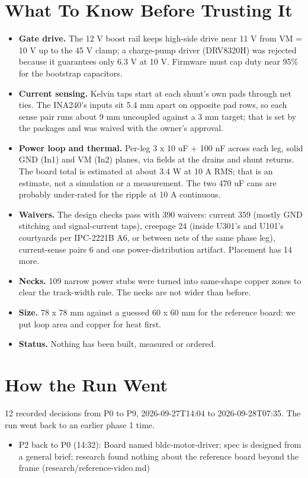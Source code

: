 \documentclass[11pt,a4paper]{article}
\begin{document}
\section{What To Know Before Trusting It}
\begin{itemize}
\item \textbf{Gate drive.} The 12 V boost rail keeps high-side drive near 11 V from VM = 10 V up to the 45 V clamp; a charge-pump driver (DRV8320H) was rejected because it guarantees only 6.3 V at 10 V. Firmware must cap duty near 95\% for the bootstrap capacitors.
\item \textbf{Current sensing.} Kelvin taps start at each shunt's own pads through net ties. The INA240's inputs sit 5.4 mm apart on opposite pad rows, so each sense pair runs about 9 mm uncoupled against a 3 mm target; that is set by the packages and was waived with the owner's approval.
\item \textbf{Power loop and thermal.} Per-leg 3 x 10 uF + 100 nF across each leg, solid GND (In1) and VM (In2) planes, via fields at the drains and shunt returns. The board total is estimated at about 3.4 W at 10 A RMS; that is an estimate, not a simulation or a measurement. The two 470 uF cans are probably under-rated for the ripple at 10 A continuous.
\item \textbf{Waivers.} The design checks pass with 390 waivers: current 359 (mostly GND stitching and signal-current taps), creepage 24 (inside U301's and U101's courtyards per IPC-2221B A6, or between nets of the same phase leg), current-sense pairs 6 and one power-distribution artifact. Placement has 14 more.
\item \textbf{Necks.} 109 narrow power stubs were turned into same-shape copper zones to clear the track-width rule. The necks are not wider than before.
\item \textbf{Size.} 78 x 78 mm against a guessed 60 x 60 mm for the reference board: we put loop area and copper for heat first.
\item \textbf{Status.} Nothing has been built, measured or ordered.
\end{itemize}
\section{How the Run Went}
12 recorded decisions from P0 to P9, 2026-09-27T14:04 to 2026-09-28T07:35. The run went back to an earlier phase 1 time.
\begin{itemize}
\item P2 back to P0 (14:32): Board named bldc-motor-driver; spec is designed from a general brief; research found nothing about the reference board beyond the frame (research/reference-video.md)
\end{itemize}
\end{document}
